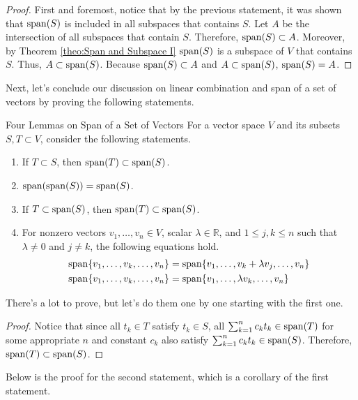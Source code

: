 \documentclass[../main.tex]{subfiles}
\begin{document}
\begin{proof}
First and foremost, notice that by the previous statement, it was
shown that $\operatorname{span}(S)$ is included in all subspaces that contains $S$.
Let $A$ be the intersection of all subspaces that contain $S$.
Therefore, $\operatorname{span}(S) \subset A$. Moreover, by Theorem
\ref{theo:Span and Subspace I} $\operatorname{span}(S)$ is a subspace of $V$ that
contains $S$. Thus, $A \subset \operatorname{span}(S)$. Because $\operatorname{span}(S) \subset A$
and $A \subset \operatorname{span}(S)$, $\operatorname{span}(S) = A$.
\end{proof}

Next, let's conclude our discussion on linear combination and span
of a set of vectors by proving the following statements.

\begin{theorem}{Four Lemmas on Span of a Set of Vectors}
For a vector space $V$ and its subsets $S, T \subset V$, consider the
following statements.
\begin{enumerate}[noitemsep]
\item If $T \subset S$, then $\operatorname{span}(T) \subset \operatorname{span}(S)$.
\item $\operatorname{span}(\operatorname{span}(S)) = \operatorname{span}(S)$.
\item If $T \subset \operatorname{span}(S)$, then $\operatorname{span}(T) \subset \operatorname{span}(S)$.
\item For nonzero vectors $v_1, \ldots, v_n \in V$, scalar
$\lambda \in \mathbb{R}$, and $1 \leq j, k \leq n$ such that $\lambda
\neq 0$ and $j \neq k$, the following equations hold.
\vspace{-0.5\baselineskip}
\begin{align*}
    \operatorname{span}\{ v_1, \ldots, v_k, \ldots, v_n \}
    &= \operatorname{span}\{ v_1, \ldots, v_k + \lambda v_j, \ldots, v_n \} \\
    \operatorname{span}\{ v_1, \ldots, v_k, \ldots, v_n \}
    &= \operatorname{span}\{ v_1, \ldots, \lambda v_k, \ldots, v_n \}
\end{align*}
\end{enumerate}
\end{theorem}

There's a lot to prove, but let's do them one by one starting with
the first one.

\begin{proof}
Notice that since all $t_k \in T$ satisfy $t_k \in S$, all
$\sum_{k=1}^n c_k t_k \in \operatorname{span}(T)$ for some appropriate $n$ and
constant $c_k$ also satisfy $\sum_{k=1}^n c_k t_k \in \operatorname{span}(S)$.
Therefore, $\operatorname{span}(T) \subset \operatorname{span}(S)$.
\end{proof}

Below is the proof for the second statement, which is a corollary
of the first statement.
\end{document}
